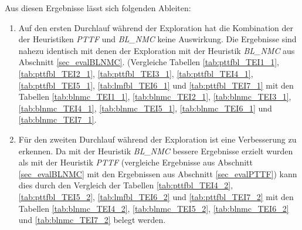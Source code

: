 \begin{multicols}{2}
\columnbreak
{}
\end{multicols}

\begin{multicols}{2}
\columnbreak
{}
\end{multicols}

\begin{multicols}{2}
\columnbreak
{}
\end{multicols}
\noindent
Aus diesen Ergebnisse lässt sich folgenden Ableiten:
\begin{enumerate}
\item Auf den ersten Durchlauf während der Exploration hat die Kombination der der Heuristiken \emph{PTTF} und \emph{BL\_NMC} keine Auswirkung. Die Ergebnisse sind nahezu identisch mit denen der Exploration mit der Heuristik \emph{BL\_NMC} aus Abschnitt \ref{sec_evalBLNMC}. (Vergleiche Tabellen \ref{tab:pttfbl_TEI1_1}, \ref{tab:pttfbl_TEI2_1}, \ref{tab:pttfbl_TEI3_1}, \ref{tab:pttfbl_TEI4_1}, \ref{tab:pttfbl_TEI5_1}, \ref{tab:lmfbl_TEI6_1} und  \ref{tab:pttfbl_TEI7_1} mit den Tabellen \ref{tab:blnmc_TEI1_1}, \ref{tab:blnmc_TEI2_1}, \ref{tab:blnmc_TEI3_1}, \ref{tab:blnmc_TEI4_1}, \ref{tab:blnmc_TEI5_1}, \ref{tab:blnmc_TEI6_1} und \ref{tab:blnmc_TEI7_1}.
\item Für den zweiten Durchlauf während der Exploration ist eine Verbesserung  zu erkennen. Da mit der Heuristik \emph{BL\_NMC} bessere Ergebnisse erzielt wurden als mit der Heuristik \emph{PTTF} (vergleiche Ergebnisse aus Abschnitt \ref{sec_evalBLNMC} mit den Ergebnissen aus Abschnitt \ref{sec_evalPTTF}) kann dies durch den Vergleich der Tabellen \ref{tab:pttfbl_TEI4_2}, \ref{tab:pttfbl_TEI5_2}, \ref{tab:lmfbl_TEI6_2} und  \ref{tab:pttfbl_TEI7_2} mit den Tabellen \ref{tab:blnmc_TEI4_2}, \ref{tab:blnmc_TEI5_2}, \ref{tab:blnmc_TEI6_2} und \ref{tab:blnmc_TEI7_2} belegt werden.
\end{enumerate}


